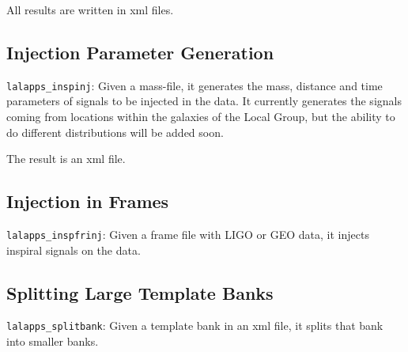 All results are written in xml files.

\subsection{Injection Parameter Generation}

\texttt{lalapps\_inspinj}: Given a mass-file, it generates the mass,
  distance and time parameters of signals to be injected in the data.
  It currently generates the signals coming from locations within the
  galaxies of the Local Group, but the ability to do different distributions
  will be added soon.

  The result is an xml file.

\subsection{Injection in Frames}

\texttt{lalapps\_inspfrinj}: Given a frame file with LIGO or GEO data, it
injects inspiral signals on the data.


\subsection{Splitting Large Template Banks}

\texttt{lalapps\_splitbank}: Given a template bank in an xml file, it splits
that bank into smaller banks.

\clearpage


\clearpage


\clearpage


\clearpage


\clearpage


\clearpage


\clearpage


\clearpage


\clearpage


\clearpage


\clearpage


\clearpage


%
%
